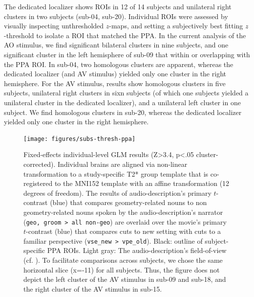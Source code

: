 \documentclass[english]{article}
\begin{document}
The dedicated localizer \citep{sengupta2016extension} shows ROIs in 12 of 14
subjects and unilateral right clusters in two subjects (sub-04, sub-20).
Individual ROIs were assessed by visually inspecting unthresholded $z$-maps, and
setting a subjectively best fitting $z$-threshold to isolate a ROI that matched
the PPA.
In the current analysis of the AO stimulus, we find significant bilateral
clusters in nine subjects, and one significant cluster in the left hemisphere of
sub-09 that within or overlapping with the PPA ROI.
In sub-04, two homologous clusters are apparent, whereas the dedicated localizer
(and AV stimulus) yielded only one cluster in the right hemisphere.
For the AV stimulus, results show homologous clusters in five subjects,
unilateral right clusters in sixn subjects (of which one subjects yielded a
unilateral cluster in the dedicated localizer), and a unilateral left cluster in
one subject.
We find homologous clusters in sub-20, whereas the dedicated localizer yielded
only one cluster in the right hemisphere.



\begin{figure} \centering
    \texttt{[image: figures/subs-thresh-ppa]}
    \caption{Fixed-effects individual-level GLM results (Z>3.4, p<.05
        cluster-corrected).
        Individual brains are aligned via non-linear
        transformation to a study-specific T2* group template that is
        co-registered to the MNI152 template with an affine transformation (12
        degrees of freedom).
        The results of audio-description's primary
        $t$-contrast (blue) that compares geometry-related nouns to non
        geometry-related nouns spoken by the audio-description's narrator
        (\texttt{geo, groom > all non-geo}) are overlaid over the movie's
        primary $t$-contrast (blue) that compares cuts to new setting with cuts
        to a familiar perspective (\texttt{vse\_new > vpe\_old}).
        Black:
        outline of subject-specific PPA ROIs.
        Light gray: The
        audio-description's field-of-view (cf. \citep{hanke2014audiomovie}).
        To facilitate comparisons across subjects, we chose the same horizontal
        slice (x=-11) for all subjects. Thus, the figure does not depict the
        left cluster of the AV stimulus in sub-09 and sub-18, and the right
        cluster of the AV stimulus in sub-15.}
    \label{fig:subs-thresh-ppa}
\end{figure}
\end{document}
